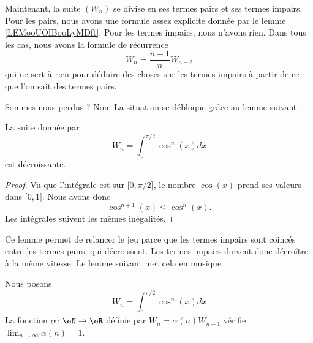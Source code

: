 Maintenant, la suite \( (W_n)\) se divise en ses termes pairs et ses termes impairs. Pour les pairs, nous avons une formule assez explicite donnée par le lemme \ref{LEMooUOIBooLyMDft}. Pour les termes impairs, nous n'avons rien. Dans tous les cas, nous avons la formule de récurrence
\begin{equation}
	W_n=\frac{ n-1 }{ n }W_{n-2}
\end{equation}
qui ne sert à rien pour déduire des choses sur les termes impairs à partir de ce que l'on sait des termes pairs.

Sommes-nous perdus ? Non. La situation se débloque grâce au lemme suivant.

\begin{lemma}       \label{LEMooZFBVooQsOuOx}
	La suite donnée par
	\begin{equation}
		W_n=\int_0^{\pi/2}\cos^n(x)dx
	\end{equation}
	est décroissante.
\end{lemma}

\begin{proof}
	Vu que l'intégrale est sur \( \mathopen[ 0 , \pi/2 \mathclose]\), le nombre \( \cos(x)\) prend ses valeurs dans \( \mathopen[ 0 , 1 \mathclose]\). Nous avons donc
	\begin{equation}
		\cos^{n+1}(x)\leq \cos^n(x).
	\end{equation}
	Les intégrales suivent les mêmes inégalités.
\end{proof}

Ce lemme permet de relancer le jeu parce que les termes impairs sont coincés entre les termes pairs, qui décroissent. Les termes impairs doivent donc décroître à la même vitesse. Le lemme suivant met cela en musique.

\begin{lemma}       \label{LEMooAXTEooLBXQuM}
	Nous posons
	\begin{equation}
		W_n=\int_0^{\pi/2}\cos^n(x)dx
	\end{equation}
	La fonction \( \alpha\colon \eN\to \eR\) définie par \( W_n=\alpha(n)W_{n-1}\) vérifie \( \lim_{n\to \infty} \alpha(n)=1\).
\end{lemma}

